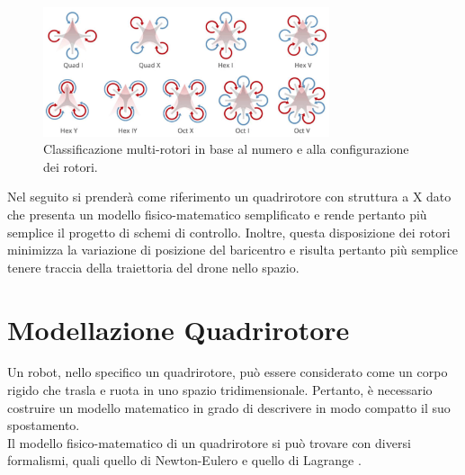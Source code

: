 \begin{figure}[H]
    \centering
    \includegraphics[width=0.75\textwidth]{gfx/drone_types}
    \caption[Classificazione multi-rotori.]{Classificazione multi-rotori in base al numero e alla configurazione dei rotori.}
    \label{fig:droneTypes}
\end{figure}

Nel seguito si prenderà come riferimento un quadrirotore con struttura a X dato che presenta un modello fisico-matematico semplificato e rende pertanto più semplice il progetto di schemi di controllo. Inoltre, questa disposizione dei rotori minimizza la variazione di posizione del baricentro e risulta pertanto più semplice tenere traccia della traiettoria del drone nello spazio.


\section{Modellazione Quadrirotore}
Un robot, nello specifico un quadrirotore, può essere considerato come un corpo rigido che trasla e ruota in uno spazio tridimensionale. Pertanto, è necessario costruire un modello matematico in grado di descrivere in modo compatto il suo spostamento.\\

Il modello fisico-matematico di un quadrirotore si può trovare con diversi formalismi, quali quello di Newton-Eulero e quello di Lagrange \cite{modelloQuad1} \cite{modelloQuad2} \cite{modelloQuad3}.\\

